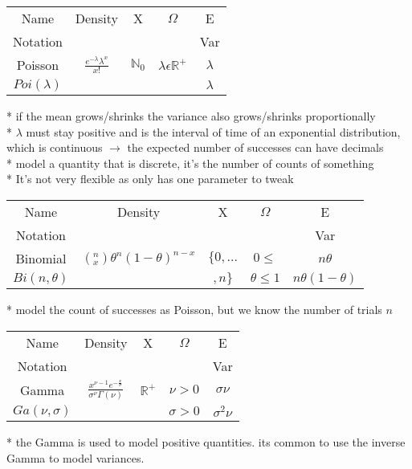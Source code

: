 \documentclass[10pt,landscape]{article}
\begin{document}
\begin{multicols}{3}
\begin{center}
\begin{tabular}{ |ccccc| }
\hline
Name & Density & X & $\Omega$ & E \\
Notation &  &  &  & Var \\
\hline
Poisson & $\frac{e^{-\lambda}\lambda^x}{x!}$ & $\mathbb{N}_{0}$ & $\lambda \epsilon \mathbb{R}^{+}$ & $\lambda$ \\
$Poi(\lambda)$ &  &  &  & $\lambda$ \\
\hline
\end{tabular}
\end{center}
* if the mean grows/shrinks the variance also grows/shrinks proportionally \\
* $\lambda$ must stay positive and is the interval of time of an exponential distribution, which is continuous $\rightarrow$ the expected number of successes can have decimals \\
* model a quantity that is discrete, it's the number of counts of something \\
* It's not very flexible as only has one parameter to tweak

\begin{center}
\begin{tabular}{ |ccccc| }
\hline
Name & Density & X & $\Omega$ & E \\
Notation &  &  &  & Var \\
\hline
Binomial & $\left(\text{}_x^n\right) \theta^n (1 - \theta)^{n - x}$ & $\{0,...$ & $0 \leq$ & $n \theta$ \\
$Bi(n, \theta)$ &  & $,n\}$ & $\theta \leq 1$ & $n \theta (1 - \theta)$ \\
\hline
\end{tabular}
\end{center}
* model the count of successes as Poisson, but we know the number of trials $n$

\begin{center}
\begin{tabular}{ |ccccc| }
\hline
Name & Density & X & $\Omega$ & E \\
Notation &  &  &  & Var \\
\hline
Gamma & $\frac{x^{\nu - 1} e^{-\frac{x}{\sigma}}}{\sigma^\nu \Gamma(\nu)}$ & $\mathbb{R}^{+}$ & $\nu > 0$ & $\sigma \nu$ \\
$Ga(\nu,\sigma)$ &  &  & $\sigma > 0$ & $\sigma^2 \nu$ \\
\hline
\end{tabular}
\end{center}
* the Gamma is used to model positive quantities. its common to use the inverse Gamma to model variances.


\end{multicols}
\end{document}
